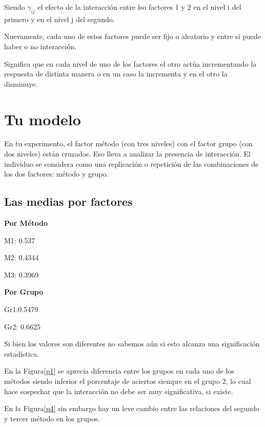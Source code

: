 \documentclass[a4paper,12pt]{article}
\begin{document}
Siendo $\gamma_{ij}$ el efecto de la interacción entre lso factores 1 y 2 en el nivel i del primero y en el nivel j del segundo.

Nuevamente, cada uno de estos factores puede ser fijo o aleatorio y entre sí puede haber o no interacción.

\begin{center}
\end{center}

Significa que en cada nivel de uno de los factores el otro actúa incrementando la respuesta de distinta  manera o en un caso la incrementa y en el otro la disminuye.

\section{Tu modelo}
En tu experimento, el factor método (con tres niveles) con el factor grupo (con dos niveles) están cruzados. Eso lleva a analizar la presencia de interacción.
El individuo se considera como una replicación o repetición de las combinaciones de los dos factores: método y grupo.


\subsection{Las medias por factores}

\textbf{Por Método}

M1: 0.537

M2: 0.4344

M3:  0.3969

\textbf{Por Grupo}

Gr1:0.5479 

Gr2: 0.6625 

Si bien los valores son diferentes no sabemos aún si esto alcanza una significación estadística.

En la Figura\ref{p1} se aprecia diferencia entre los grupos en cada uno de los métodos siendo inferior el porcentaje de aciertos siempre en el grupo 2, lo cual hace sospechar que la interacción no debe ser muy significativa, si existe.

En la Figura\ref{p4} sin embargo hay un leve cambio entre las relaciones del segundo y tercer método en los grupos.
\end{document}
